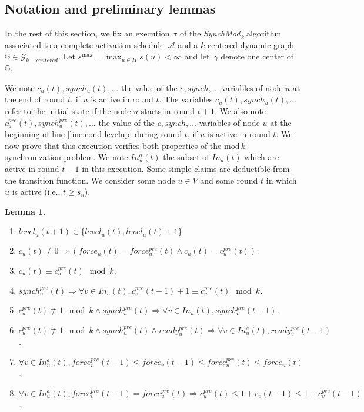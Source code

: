 \documentclass[11pt,letterpaper]{article}
\newtheorem{lem}[thm]{Lemma}
\newcommand{\cent}{\gamma}
\newcommand{\SM}{{\em SynchMod}$_{\,k}\ $}
\begin{document}
\subsection{Notation and preliminary lemmas}

In the rest of this section, we fix an execution $\sigma$ of the \SM algorithm associated to a complete activation
schedule~$\mathcal{A}$ and a $k$-centered dynamic graph~$\mathds{G} \in \mathcal{G}_{k-centered}$. 
Let $s^{\max} = \max_{u \in \Pi} s(u) < \infty$ and let~$\cent$ denote one center of~$\mathds{G}$.

We note $c_u(t), synch_u(t), \dots$ the value of the $c, synch, \dots$ variables of node $u$ at the end of round $t$, if $u$ is active in round $t$.
The variables $c_u(t), synch_u(t), \dots$ refer to the initial state if the node $u$ starts in round $t+1$.
We also note $c^{pre}_u(t), synch^{pre}_u(t), \dots$ the value of the $c, synch, \dots$ variables
of node $u$ at the beginning of line \ref{line:cond-levelup} during round $t$, if $u$ is active in round $t$.
We now prove that this execution verifies both properties of the $\mathrm{mod}\,k$-synchronization problem.
We note $In_u^a(t)$ the subset of $In_u(t)$ which are active in round $t-1$ in this execution.
Some simple claims are deductible from the transition function.
We consider some node $u \in V$ and some round $t$ in which $u$ is active (i.e., $t \geq s_u$).
\begin{lem} \hfill
	\begin{enumerate}[label=\upshape(\alph*),ref=\thethm (\alph*)]
		\item\label{lem:cl1} $level_u(t+1) \in \{level_u(t), level_u(t)+1\}$
		\item\label{lem:cl2b}$c_u(t) \neq 0 \Rightarrow (force_u(t) = force_u^{pre}(t) \wedge c_u(t) =  c_u^{pre}(t))$.
		\item\label{lem:cl2} $c_u(t) \equiv c_u^{pre}(t) \mod k$.
		\item\label{lem:cl3} $synch_u^{pre}(t) \Rightarrow \forall v \in In_u(t), c_v^{pre}(t-1) + 1 \equiv c_u^{pre}(t) \mod k$.
		\item\label{lem:cl4} $c_u^{pre}(t) \not\equiv 1 \mod k \wedge synch_u^{pre}(t) \Rightarrow \forall v \in In_u(t), synch_v^{pre}(t-1)$.
		\item\label{lem:cl5} $c_u^{pre}(t) \not\equiv 1 \mod k \wedge synch_u^{pre}(t) \wedge ready_u^{pre}(t) \Rightarrow \forall v \in In_u^a(t), ready_v^{pre}(t-1)$.
		\item\label{lem:cl6} $\forall v \in In_u^a(t), force_v^{pre}(t-1) \leq force_v(t-1) \leq force_u^{pre}(t) \leq force_u(t)$.
		\item\label{lem:cl7} $\forall v \in In_u^a(t), force_v^{pre}(t-1) = force_u^{pre}(t) \Rightarrow c_u^{pre}(t) \leq 1+c_v(t-1) \leq 1+c_v^{pre}(t-1)$.
	\end{enumerate}
\end{lem}
\end{document}
